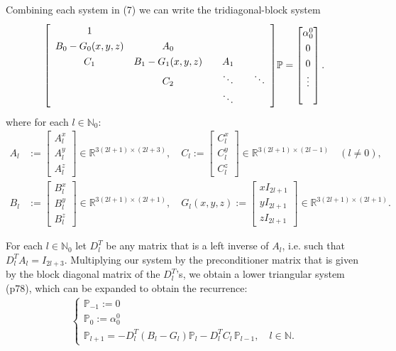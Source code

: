 \documentclass[11pt, oneside]{article}   	%
\newcommand{\R}{\mathbb{R}}
\newcommand{\N}{\mathbb{N}}
\newcommand{\No}{\mathbb{N}_0}
\newcommand{\bigP}{\mathbb{P}}
\newcommand{\Pl}{\mathbb{P}_l}
\newcommand{\Dlt}{D^T_l}
\begin{document}
Combining each system in (7) we can write the tridiagonal-block system
\begin{align}
\renewcommand\arraystretch{1.3}
\mleft[
\begin{array}{cccc}
		1  & & & \\
		B_0-G_0(x,y,z) & A_0 & & \\
		C_1 & B_1-G_1(x,y,z) & \quad A_1 \quad & \\
		& C_2 & \ddots & \ddots \\
		& & \ddots &
\end{array}
\mright]
\bigP
=
\begin{bmatrix}
	\alpha^0_0 \\ 0 \\ 0 \\ \vdots \\ \\
\end{bmatrix}.
\end{align}
where for each \(l \in \No\):
\begin{align}
A_l &:= \begin{bmatrix}
		A^x_l \\
		A^y_l \\
		A^z_l
	    \end{bmatrix} \in \R^{3(2l+1)\times(2l+3)}, \quad
C_l := \begin{bmatrix}
		C^x_l \\
		C^y_l \\
		C^z_l
	    \end{bmatrix} \in \R^{3(2l+1)\times(2l-1)} \quad (l \ne 0), \\
B_l &:= \begin{bmatrix}
		B^x_l \\
		B^y_l \\
		B^z_l
	    \end{bmatrix} \in \R^{3(2l+1)\times(2l+1)}, \quad
G_l(x,y,z) := \begin{bmatrix}
		xI_{2l+1} \\
		yI_{2l+1} \\
		zI_{2l+1}
	    \end{bmatrix} \in \R^{3(2l+1)\times(2l+1)}.
\end{align}

For each \(l \in \No\) let \(\Dlt\) be any matrix that is a left inverse of \(A_l\), i.e. such that \(\Dlt A_l = I_{2l+3}\). Multiplying our system by the preconditioner matrix that is given by the block diagonal matrix of the \(\Dlt\)'s, we obtain a lower triangular system \citep{dunkl2014orthogonal} (p78), which can be expanded to obtain the recurrence:
\begin{align}
\begin{cases}
\bigP_{-1} := 0 \\
\bigP_{0} := \alpha^0_0 \\
\bigP_{l+1} = -\Dlt (B_l-G_l) \Pl - \Dlt C_l  \,\bigP_{l-1}, \quad l \in \N.
\end{cases}
\end{align}
\end{document}
